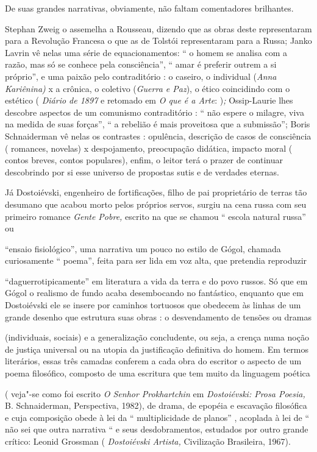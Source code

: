 De suas grandes narrativas, obviamente, não faltam comentadores
brilhantes.

Stephan Zweig o assemelha a Rousseau, dizendo que as obras deste
representaram para a Revolução Francesa o que as de Tolstói
representaram para a Russa; Janko Lavrin vê nelas uma série de
equacionamentos: `` o homem se analisa com a razão, mas só se conhece
pela consciência'', `` amar é preferir outrem a si próprio'', e uma
paixão pelo contraditório : o caseiro, o individual (\emph{Anna
Kariênina)} x a crônica, o coletivo (\emph{Guerra e Paz}), o ético
coincidindo com o estético ( \emph{Diário de 1897} e retomado em \emph{O
que é a Arte}: )\emph{;} Ossip-Laurie lhes descobre aspectos de um
comunismo contraditório : `` não espere o milagre, viva na medida de
suas forças'', `` a rebelião é mais proveitosa que a submissão''; Boris
Schnaiderman vê nelas os contrastes : opulência, descrição de casos de
consciência ( romances, novelas) x despojamento, preocupação didática,
impacto moral ( contos breves, contos populares), enfim, o leitor terá o
prazer de continuar descobrindo por si esse universo de propostas sutis
e de verdades eternas.

Já Dostoiévski, engenheiro de fortificações, filho de pai proprietário
de terras tão desumano que acabou morto pelos próprios servos, surgiu na
cena russa com seu primeiro romance \emph{Gente Pobre,} escrito na que
se chamou `` escola natural russa'' ou

``ensaio fisiológico'', uma narrativa um pouco no estilo de Gógol,
chamada curiosamente `` poema'', feita para ser lida em voz alta, que
pretendia reproduzir

``daguerrotipicamente'' em literatura a vida da terra e do povo russos.
Só que em Gógol o realismo de fundo acaba desembocando no fantástico,
enquanto que em Dostoiévski ele se insere por caminhos tortuosos que
obedecem às linhas de um grande desenho que estrutura suas obras : o
desvendamento de tensões ou dramas

(individuais, sociais) e a generalização concludente, ou seja, a crença
numa noção de justiça universal ou na utopia da justificação definitiva
do homem. Em termos literários, essas três camadas conferem a cada obra
do escritor o aspecto de um poema filosófico, composto de uma escritura
que tem muito da linguagem poética

( veja"-se como foi escrito \emph{O Senhor Prokhartchin} em
\emph{Dostoiévski: Prosa Poesia,} B. Schnaiderman, Perspectiva, 1982), de
drama, de epopéia e escavação filosófica e cuja composição obede à lei
da `` multiplicidade de planos'' , acoplada à lei de `` não sei que
outra narrativa `` e seus desdobramentos, estudados por outro grande
crítico: Leonid Grossman ( \emph{Dostoiévski Artista,} Civilização
Brasileira, 1967).


